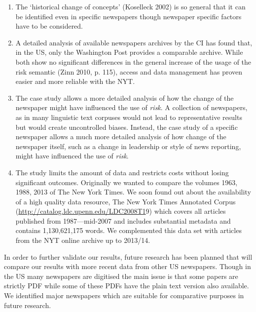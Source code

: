 \documentclass{report}
\begin{document}
\begin{enumerate}
\item The `historical change of concepts' (Koselleck 2002) is so general that it can be identified even in specific newspapers though newspaper specific factors have to be considered. 
\item A detailed analysis of available newspapers archives by the CI has found that, in the US, only the Washington Post provides a comparable archive. While both show no significant differences in the general increase of the usage of the risk semantic (Zinn 2010, p. 115), access and data management has proven easier and more reliable with the NYT. 
\item The case study allows a more detailed analysis of how the change of the newspaper might have influenced the use of \emph{risk}. A collection of newspapers, as in many linguistic text corpuses would not lead to representative results but would create uncontrolled biases. Instead, the case study of a specific newspaper allows a much more detailed analysis of how change of the newspaper itself, such as a change in leadership or style of news reporting, might have influenced the use of \emph{risk}.
\item The study limits the amount of data and restricts costs without losing significant outcomes.
Originally we wanted to compare the volumes 1963, 1988, 2013 of The New York Times. We soon found out about the availability of a high quality data resource, The New York Times Annotated Corpus (\url{http://catalog.ldc.upenn.edu/LDC2008T1}9) which covers all articles published from 1987---mid-2007 and includes substantial metadata and contains 1,130,621,175 words. We complemented this data set with articles from the NYT online archive up to 2013\slash 14.
\end{enumerate}
%
In order to further validate our results, future research has been planned that will compare our results with more recent data from other US newspapers. Though in the US many newspapers are digitised the main issue is that some papers are strictly PDF while some of these PDFs have the plain text version also available. We identified major newspapers which are suitable for comparative purposes in future research. %
\end{document}
